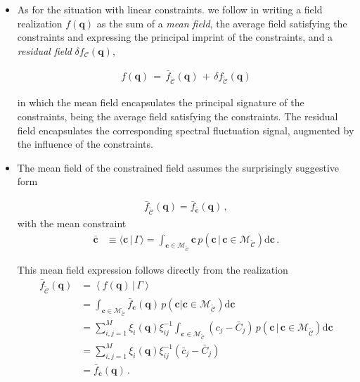 \documentclass[a4paper, 11pt]{article}
\begin{document}
\begin{itemize}
\item As for the situation with linear constraints. we follow \cite{Bertschinger:1987} in writing a field realization $f(\bm{q})$ as the sum of a \textit{mean field}, the average field satisfying the constraints and expressing the principal imprint of the constraints, and a \textit{residual field} $\delta f_{\mathcal{C}}(\bm{q})$,

\begin{framed}
\begin{align}
    f(\bm{q})\,=\,\bar{f}_{\mathcal{\tilde C}}(\bm{q})\,+\,\delta f_{\mathcal{\tilde C}}(\bm{q})
\end{align}
\end{framed}
in which the mean field encapsulates the principal signature of the constraints, being the average field satisfying the constraints. The residual field encapsulates the corresponding spectral fluctuation signal, augmented by the influence of the constraints. 
  
\item
The mean field of the constrained field assumes the surprisingly suggestive form 
\begin{framed}
\begin{align}
\bar{f}_{\mathcal{\tilde C}}(\bm{q}) =\bar{f}_{\bar{\bm{c}}}(\bm{q})\,,
\end{align}
with the mean constraint
\begin{align}
\bar{\bm{c}} &\equiv \langle \bm{c} \,|\, \Gamma\rangle = \int_{\bm{c} \in \mathcal{M}_{\mathcal{\tilde C}}}  \bm{c}\, p(\bm{c}\,|\,\bm{c}\in \mathcal{M}_{\mathcal{\tilde C}}) \mathrm{d}\bm{c}\,.
\end{align}
\end{framed}
This mean field expression follows directly from the realization  
\begin{align}
\bar{f}_{\mathcal{\tilde C}}(\bm{q}) 
&=\left\langle f(\bm{q})\,|\,\Gamma\right \rangle \nonumber\\
&= \int_{\bm{c} \in \mathcal{M}_{\mathcal{\tilde C}}} \bar{f}_{\bm{c}}(\bm{q})\, p(\bm{c}|\bm{c}\in \mathcal{M}_{\mathcal{\tilde C}}) \mathrm{d}\bm{c}\nonumber\\
&= \sum_{i,j=1}^M\xi_i(\bm{q}) \xi_{ij}^{-1}\int_{\bm{c} \in \mathcal{M}_{\mathcal{\tilde C}}}  (c_j-\bar{C}_j)\, p(\bm{c}\,|\,\bm{c}\in \mathcal{M}_{\mathcal{\tilde C}}) \mathrm{d}\bm{c}\nonumber\\
&= \sum_{i,j=1}^M \xi_i(\bm{q}) \xi_{ij}^{-1} (\bar{c}_j-\bar{C}_j)\nonumber\\
&= \bar{f}_{\bar{\bm{c}}}(\bm{q})\,.
\end{align}


\end{itemize}
\end{document}

